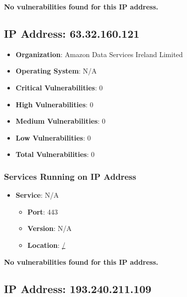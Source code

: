 \documentclass{article}
\begin{document}
\textbf{No vulnerabilities found for this IP address.}




\clearpage



\subsection{IP Address: 63.32.160.121}

\begin{itemize}
    \item \textbf{Organization}: Amazon Data Services Ireland Limited
    \item \textbf{Operating System}:  N/A 
    \item \textbf{Critical Vulnerabilities}: 0
    \item \textbf{High Vulnerabilities}: 0
    \item \textbf{Medium Vulnerabilities}: 0
    \item \textbf{Low Vulnerabilities}: 0
    \item \textbf{Total Vulnerabilities}: 0
\end{itemize}

\subsubsection*{Services Running on IP Address}

\begin{itemize}
    
        \item \textbf{Service}: N/A
        \begin{itemize}
            \item \textbf{Port}: 443
            \item \textbf{Version}:  N/A 
            \item \textbf{Location}: \href{ / }{ / }
        \end{itemize}
    
\end{itemize}


\textbf{No vulnerabilities found for this IP address.}




\clearpage



\subsection{IP Address: 193.240.211.109}
\end{document}
